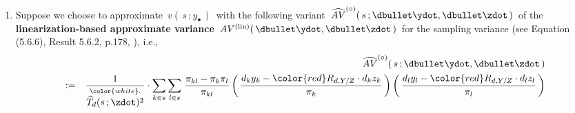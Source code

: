 \begin{lemma}
\begin{enumerate}
\begin{equation*}
                \widehat{R}_{d,Y/Z}
                \,\left\vert\!
                \begin{array}{c}
                \Ydot, \\ \Zdot, \Xobs
                \end{array}
                \right.
                \!\!\right)
            \,\right]
    \end{equation*}
\item
    Suppose we choose to approximate
    \,$v(\,s\,;y_{\bullet}\,)$\,
    with the following {\color{red}variant}
    \,$\widehat{AV}^{\textnormal{($\circ$)}}(\,s\,;\dbullet\ydot,\dbullet\zdot\,)$\,
    of the \textbf{linearization-based approximate variance}
    \,$AV^{\textnormal{(lin)}}(\,\dbullet\ydot,\dbullet\zdot\,)$\,
    for the sampling variance (see Equation
    (5.6.6), Result 5.6.2, p.178, \cite{Sarndal1992}), i.e.,
    \begin{eqnarray*}
    &&
        \widehat{AV}^{\textnormal{($\circ$)}}(\,s\,;\dbullet\ydot,\dbullet\zdot\,)
    \\
    & := &
        \dfrac{1}{
            \overset{{\color{white}.}}{\widehat{T}_{d}(s\,;\zdot)^{2}}
            }
        \cdot
        \underset{k \in s}{\sum}\,
        \underset{l \in s}{\sum}\;
        \dfrac{\pi_{kl} - \pi_{k}\pi_{l}}{\pi_{kl}}
        \left(\,
            \dfrac{
                d_{k}y_{k} - {\color{red}R_{d,Y/Z}} \cdot d_{k}z_{k}
                }{
                \pi_{k}
                }
            \,\right)
        \left(\,
            \dfrac{
                d_{l}y_{l} - {\color{red}R_{d,Y/Z}} \cdot d_{l}z_{l}
                }{
                \pi_{l}
                }
            \,\right)

\end{eqnarray*}
\end{enumerate}
\end{lemma}
